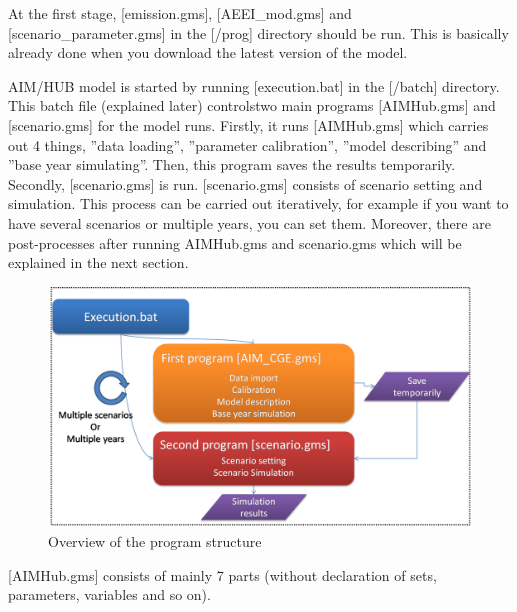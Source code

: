 \documentclass[10pt,a4paper,titlepage,dvipdfmx]{book}
\begin{document}
At the first stage, [emission.gms], [AEEI\_mod.gms] and [scenario\_parameter.gms] in the [/prog] directory should be run. This is basically already done when you download the latest version of the model.

AIM/HUB model is started by running [execution.bat] in the [/batch] directory. This batch file (explained later) controlstwo main programs [AIMHub.gms] and [scenario.gms] for the model runs. Firstly, it runs [AIMHub.gms] which carries out 4 things, ''data loading'', ''parameter calibration'', ''model describing'' and ''base year simulating''. Then, this program saves the results temporarily. Secondly, [scenario.gms] is run. [scenario.gms] consists of scenario setting and simulation. This process can be carried out iteratively, for example if you want to have several scenarios or multiple years, you can set them. Moreover, there are post-processes after running AIMHub.gms and scenario.gms which will be explained in the next section.
\begin{figure}
\includegraphics[width=1\textwidth]{fig/image10.png}
\caption{Overview of the program structure}
\label{fig:OverProg}
\end{figure}
   [AIMHub.gms] consists of mainly 7 parts (without declaration of sets, parameters, variables and so on). 
\end{document}

